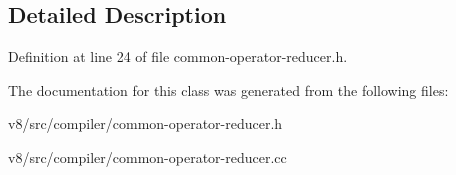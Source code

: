 \subsection{Detailed Description}


Definition at line 24 of file common-\/operator-\/reducer.\+h.



The documentation for this class was generated from the following files\+:\begin{DoxyCompactItemize}
\item 
v8/src/compiler/common-\/operator-\/reducer.\+h\item 
v8/src/compiler/common-\/operator-\/reducer.\+cc\end{DoxyCompactItemize}
